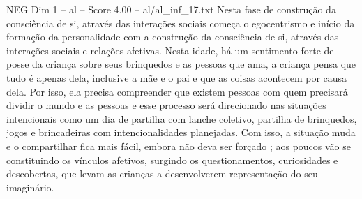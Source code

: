 \begin{textsample}{NEG Dim 1 – al – Score 4.00 – al/al\_inf\_17.txt}
Nesta fase de construção da consciência de si, através das interações sociais começa o egocentrismo e início da formação da personalidade com a construção da consciência de si, através das interações sociais e relações afetivas.
Nesta idade, há um sentimento forte de posse da criança sobre seus brinquedos e as pessoas que ama, a criança pensa que tudo é apenas dela, inclusive a mãe e o pai e que as coisas acontecem por causa dela.
Por isso, ela precisa compreender que existem pessoas com quem precisará dividir o mundo e as pessoas e esse processo será direcionado nas situações intencionais como um dia de partilha com lanche coletivo, partilha de brinquedos, jogos e brincadeiras com intencionalidades planejadas.
Com isso, a situação muda e o compartilhar fica mais fácil, embora não deva ser forçado ; aos poucos vão se constituindo os vínculos afetivos, surgindo os questionamentos, curiosidades e descobertas, que levam as crianças a desenvolverem representação do seu imaginário.

\end{textsample}
